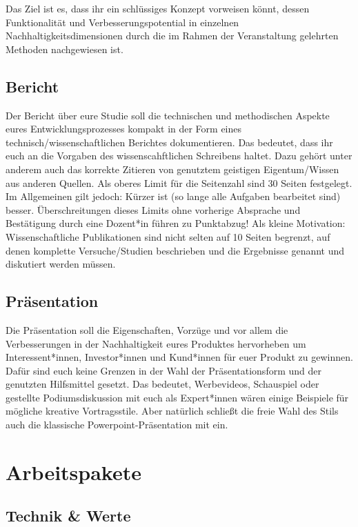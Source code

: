 \documentclass[headinclude=true]{scrartcl}
\begin{document}
Das Ziel ist es, dass ihr ein schlüssiges Konzept vorweisen könnt, dessen Funktionalität und Verbesserungspotential in einzelnen Nachhaltigkeitsdimensionen durch die im Rahmen der Veranstaltung gelehrten Methoden nachgewiesen ist. 

\subsection{Bericht}
Der Bericht über eure Studie soll die technischen und methodischen Aspekte eures Entwicklungsprozesses kompakt in der Form eines technisch/wissenschaftlichen Berichtes dokumentieren. Das bedeutet, dass ihr euch an die Vorgaben des wissenscahftlichen Schreibens haltet. Dazu gehört unter anderem auch das korrekte Zitieren von genutztem geistigen Eigentum/Wissen aus anderen Quellen. Als oberes Limit für die Seitenzahl sind 30 Seiten festgelegt. Im Allgemeinen gilt jedoch: Kürzer ist (so lange alle Aufgaben bearbeitet sind) besser. 
Überschreitungen dieses Limits ohne vorherige Absprache und Bestätigung durch eine Dozent*in führen zu Punktabzug! Als kleine Motivation: Wissenschaftliche Publikationen sind nicht selten auf 10 Seiten begrenzt, auf denen komplette Versuche/Studien beschrieben und die Ergebnisse genannt und diskutiert werden müssen.

\subsection{Präsentation}
Die Präsentation soll die Eigenschaften, Vorzüge und vor allem die Verbesserungen in der Nachhaltigkeit eures Produktes hervorheben um Interessent*innen, Investor*innen und Kund*innen für euer Produkt zu gewinnen. Dafür sind euch keine Grenzen in der Wahl der Präsentationsform und der genutzten Hilfsmittel gesetzt. Das bedeutet, Werbevideos, Schauspiel oder gestellte Podiumsdiskussion mit euch als Expert*innen wären einige Beispiele für mögliche kreative Vortragsstile. Aber natürlich schließt die freie Wahl des Stils auch die klassische Powerpoint-Präsentation mit ein. 

\section{Arbeitspakete}

\subsection{Technik \& Werte}
\end{document}
